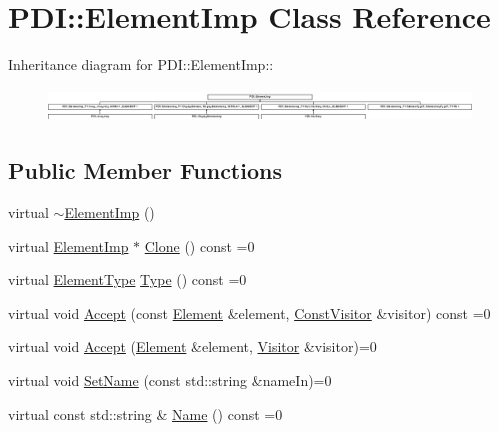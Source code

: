 \hypertarget{class_p_d_i_1_1_element_imp}{
\section{PDI::ElementImp Class Reference}
\label{class_p_d_i_1_1_element_imp}
}
Inheritance diagram for PDI::ElementImp::\begin{figure}[H]
\begin{center}
\leavevmode
\includegraphics[height=0.886076cm]{class_p_d_i_1_1_element_imp}
\end{center}
\end{figure}
\subsection*{Public Member Functions}
\begin{CompactItemize}
\item 
virtual \hyperlink{class_p_d_i_1_1_element_imp_a746488e78669ae5a034ae62d67fae2b}{$\sim$ElementImp} ()
\item 
virtual \hyperlink{class_p_d_i_1_1_element_imp}{ElementImp} $\ast$ \hyperlink{class_p_d_i_1_1_element_imp_fc1ab711c21225f3448c2a7c6a977b25}{Clone} () const =0
\item 
virtual \hyperlink{namespace_p_d_i_bbd28c6f8905ff6834d6f84ba4363e5e}{ElementType} \hyperlink{class_p_d_i_1_1_element_imp_1ab2a2d2523b358077129413c4eddd15}{Type} () const =0
\item 
virtual void \hyperlink{class_p_d_i_1_1_element_imp_441e3d2c989f21db8e01ae77616a9f77}{Accept} (const \hyperlink{class_p_d_i_1_1_element}{Element} \&element, \hyperlink{class_p_d_i_1_1_const_visitor}{ConstVisitor} \&visitor) const =0
\item 
virtual void \hyperlink{class_p_d_i_1_1_element_imp_7734c5f4b0ebd52ef8ee8c3faa4951d7}{Accept} (\hyperlink{class_p_d_i_1_1_element}{Element} \&element, \hyperlink{class_p_d_i_1_1_visitor}{Visitor} \&visitor)=0
\item 
virtual void \hyperlink{class_p_d_i_1_1_element_imp_deb17b530a00980a60e8e79753b19eed}{SetName} (const std::string \&nameIn)=0
\item 
virtual const std::string \& \hyperlink{class_p_d_i_1_1_element_imp_da2e8eb39d66e053c0d29318959aa661}{Name} () const =0
\end{CompactItemize}


